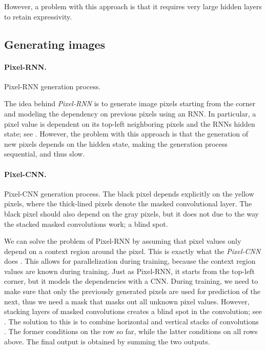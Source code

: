 However, a problem with this approach is that it requires very large hidden layers to retain
expressivity.

\subsection{Generating images}

\paragraph{Pixel-RNN.}

\begin{marginfigure}
    \centering
    \caption{Pixel-RNN generation process.}
    \label{fig:pixel-rnn}
\end{marginfigure}

The idea behind \textit{Pixel-RNN} \citep{van2016pixel} is to generate image pixels starting from
the corner and modeling the dependency on previous pixels using an RNN. In particular, a pixel
value is dependent on its top-left neighboring pixels and the RNNs hidden state; see
. However, the problem with this approach is that the generation of new pixels
depends on the hidden state, making the generation process sequential, and thus slow.

\paragraph{Pixel-CNN.}

\begin{marginfigure}
    \centering
    \caption{Pixel-CNN generation process. The black pixel depends explicitly on the yellow pixels,
        where the thick-lined pixels denote the masked convolutional layer. The black pixel should
        also depend on the gray pixels, but it does not due to the way the stacked masked
        convolutions work; a blind spot.}
    \label{fig:pixel-cnn}
\end{marginfigure}

We can solve the problem of Pixel-RNN by assuming that pixel values only depend on a context region
around the pixel. This is exactly what the \textit{Pixel-CNN} does \citep{van2016pixel}. This
allows for parallelization during training, because the context region values are known during
training. Just as Pixel-RNN, it starts from the top-left
corner, but it models the dependencies with a CNN. During training, we need to make sure that only
the previously generated pixels are used for prediction of the next, thus we need a mask that masks
out all unknown pixel values. However, stacking layers of masked convolutions creates a blind spot
in the convolution; see . The solution to this is to combine horizontal and
vertical stacks of convolutions \citep{van2016conditional}. The former conditions on the row so
far, while the latter conditions on all rows above. The final output is obtained by summing the two
outputs.

